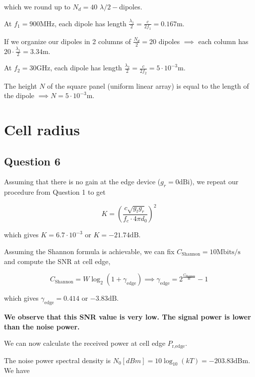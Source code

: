 \documentclass[]{article}
\begin{document}
	which we round up to $N_d = 40$ $ \lambda/2 - $dipoles.
	
	At $f_1=900\mathrm{MHz}$, each dipole has length $\frac{\lambda_1}{2} = \frac{c}{2f_1} = 0.167\mathrm{m}$.
	
	If we organize our dipoles in 2 columns of $\frac{N_d}{2} = 20$ dipoles $\implies$ each column has $20 \cdot \frac{\lambda_1}{2} = 3.34\mathrm{m}$.
	
	At $f_2=30\mathrm{GHz}$, each dipole has length $\frac{\lambda_2}{2} = \frac{c}{2f_2} = 5 \cdot 10^{-3}\mathrm{m}$.
	
	The height $N$ of the square panel (uniform linear array) is equal to the length of the dipole $\implies N = 5 \cdot 10^{-3} \mathrm{m}$.
	
	\section{Cell radius}
	
	\subsection*{Question 6}
	
	Assuming that there is no gain at the edge device ($g_r = 0\mathrm{dBi}$), we repeat our procedure from Question 1 to get
	
	\begin{equation}
		K = \left(\frac{c \sqrt{g_t g_r}}{f_c \cdot 4 \pi d_0}\right)^2
	\end{equation}
	
	which gives $K = 6.7 \cdot 10^{-3}$ or $K = -21.74\mathrm{dB}$.
	
	Assuming the Shannon formula is achievable, we can fix $C_{\text{Shannon}} = 10\mathrm{Mbits/s}$ and compute the SNR at cell edge,
	
	\begin{equation}
		C_{\text{Shannon}} = W \log_{2}(1 + \gamma_{\text{edge}}) \implies \gamma_{\text{edge}} = 2^{\frac{C_{\text{Shannon}}}{W}} - 1
	\end{equation}
	
	which gives $\gamma_{\text{edge}} = 0.414$ or $-3.83\mathrm{dB}$.
	
	\textbf{We observe that this SNR value is very low. The signal power is lower than the noise power.}
	
	We can now calculate the received power at cell edge $P_{\text{r,edge}}$.
	
	The noise power spectral density is $N_0[dBm] = 10\log_{10}(kT) = -203.83\mathrm{dBm}$. We have
	
\end{document}

